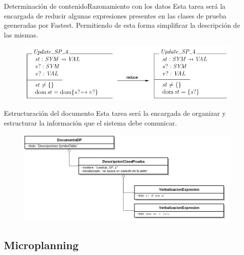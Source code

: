 \documentclass{beamer}
\begin{document}
\begin{frame}{Determinación de contenido}{Razonamiento con los datos}
  Esta tarea será la encargada de reducir algunas expresiones presentes en las clases de prueba geeneradas por Fastest. Permitiendo de esta forma simplificar la descripción de las mismas.
  \begin{figure}[H]
    \centering
    \includegraphics[scale=0.4]{img/ej_reduce.png}
  \end{figure}
\end{frame}
                                
\begin{frame}{Estructuración del documento}{}
  Esta tarea será la encargada de organizar y estructurar la información que el sistema debe comunicar.
  \begin{figure}[H]
    \centering
    \includegraphics[scale=0.3]{img/document_plan_ej.png}
  \end{figure}
\end{frame}
                                
\subsection{Microplanning}
\end{document}
